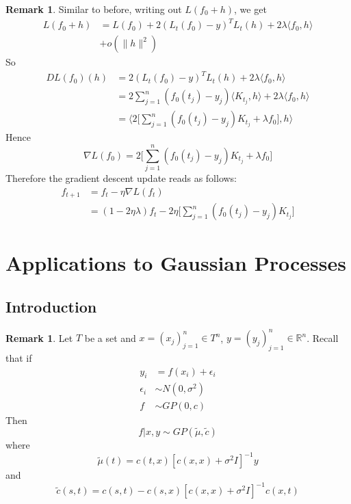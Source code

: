 \documentclass[twoside]{article}
\theoremstyle{definition}
\theoremstyle{definition}
\newtheorem{rem}[definition]{Remark}
\newcommand{\lam}{\lambda}
\newcommand{\ep}{\epsilon}
\newcommand{\sig}{\sigma}
\newcommand{\R}{\mathbb{R}}
\renewcommand{\r}{\rangle}
\renewcommand{\l}{\langle}
\begin{document}
\begin{rem}
Similar to before, writing out $L(f_0 + h)$, we get
\begin{align*}
L(f_0 + h) &= L(f_0) + 2(L_t(f_0) - y)^T L_t(h) + 2 \lam \l f_0 , h\r \\
&+ o(\|h\|^2) 
\end{align*}
So 
\begin{align*}
DL(f_0)(h) 
&= 2(L_t(f_0) - y)^T L_t(h) + 2 \lam \l f_0 , h\r \\
&= 2\sum_{j=1}^n (f_0(t_j)- y_j) \l K_{t_j}, h\r +  2 \lam \l f_0 , h\r \\
&= \bigg \l  2\bigg [ \sum_{j=1}^n (f_0(t_j)- y_j) K_{t_j} + \lam f_0\bigg ] , h \bigg \r 
\end{align*}
Hence $$\nabla L(f_0) = 2\bigg [ \sum_{j=1}^n (f_0(t_j)- y_j) K_{t_j} + \lam f_0\bigg ]$$
Therefore the gradient descent update reads as follows: 
\begin{align*}
f_{t+1} 
&= f_t - \eta \nabla L(f_t) \\
&= (1 - 2 \eta \lam)f_t - 2 \eta \bigg [\sum_{j=1}^n (f_0(t_j)- y_j) K_{t_j} \bigg ]
\end{align*}
\end{rem}


\section{Applications to Gaussian Processes}

\subsection{Introduction}
\begin{rem}
Let $T$ be a set and $x = (x_j)_{j=1}^n \in T^n$, $y = (y_j)_{j=1}^n \in \R^n$. Recall that if 
\begin{align*}
y_i &= f(x_i) + \ep_i \\
\ep_i &\sim N(0, \sig^2) \\
f &\sim GP(0, c)
\end{align*}
Then $$f|x, y \sim GP(\tilde{\mu}, \tilde{c})$$ where $$\tilde{\mu}(t) = c(t, x)[c(x,x) + \sig^2I]^{-1}y$$ and $$\tilde{c}(s,t) = c(s,t) - c(s,x)[c(x,x) + \sig^2 I]^{-1}c(x,t)$$

\end{rem}
\end{document}
